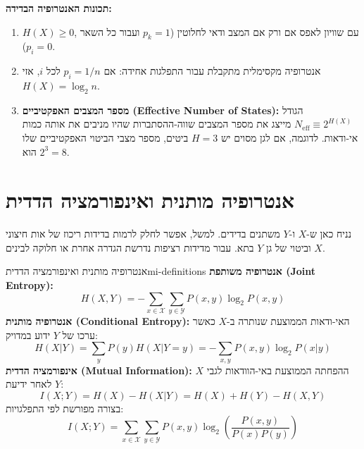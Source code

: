 \textbf{תכונות האנטרופיה הבדידה:}
\begin{enumerate}
\item $H(X) \ge 0$, עם שוויון לאפס אם ורק אם המצב ודאי לחלוטין ($p_k = 1$ ועבור כל השאר $p_i=0$).
\item אנטרופיה מקסימלית מתקבלת עבור התפלגות אחידה: אם $p_i = 1/n$ לכל $i$, אזי $H(X) = \log_2 n$.
\item \textbf{מספר המצבים האפקטיביים (\textenglish{Effective Number of States}):}
הגודל $N_{\mathrm{eff}} \equiv 2^{H(X)}$
מייצג את מספר המצבים שווה-ההסתברות שהיו מניבים את אותה כמות אי-ודאות. לדוגמה, אם לגן מסוים יש $H = 3$ ביטים, מספר מצבי הביטוי האפקטיביים שלו הוא $2^3 = 8$.
\end{enumerate}

\section{אנטרופיה מותנית ואינפורמציה הדדית}\label{sec:mutual-information}
נניח כאן ש-$X$ ו-$Y$ משתנים בדידים. למשל, אפשר לחלק לרמות בדידות ריכוז של אות חיצוני $X$ וביטוי של גן $Y$ בתא. עבור מדידות רציפות נדרשת הגדרה אחרת או חלוקה לבינים.

\begin{definition}{אנטרופיה מותנית ואינפורמציה הדדית}{mi-definitions}
\textbf{אנטרופיה משותפת (\textenglish{Joint Entropy}):}
\begin{equation}\label{eq:joint-entropy}
H(X, Y) = -\sum_{x \in \mathcal{X}}\sum_{y \in \mathcal{Y}} P(x, y) \log_2 P(x, y)
\end{equation}
\textbf{אנטרופיה מותנית (\textenglish{Conditional Entropy}):}
האי-ודאות הממוצעת שנותרה ב-$X$ כאשר ערכו של $Y$ ידוע במדויק:
\begin{equation}\label{eq:cond-entropy}
H(X|Y) = \sum_{y} P(y) H(X|Y=y) = -\sum_{x,y} P(x, y) \log_2 P(x|y)
\end{equation}
\textbf{אינפורמציה הדדית (\textenglish{Mutual Information}):}
ההפחתה הממוצעת באי-הוודאות לגבי $X$ לאחר ידיעת $Y$:
\begin{equation}\label{eq:mi-def}
\boxed{I(X; Y) = H(X) - H(X|Y) = H(X) + H(Y) - H(X, Y)}
\end{equation}
בצורה מפורשת לפי התפלגויות:
\begin{equation}\label{eq:mi-sum-formula}
I(X; Y) = \sum_{x \in \mathcal{X}}\sum_{y \in \mathcal{Y}} P(x, y) \log_2 \left(\frac{P(x, y)}{P(x)P(y)}\right)
\end{equation}
\end{definition}

